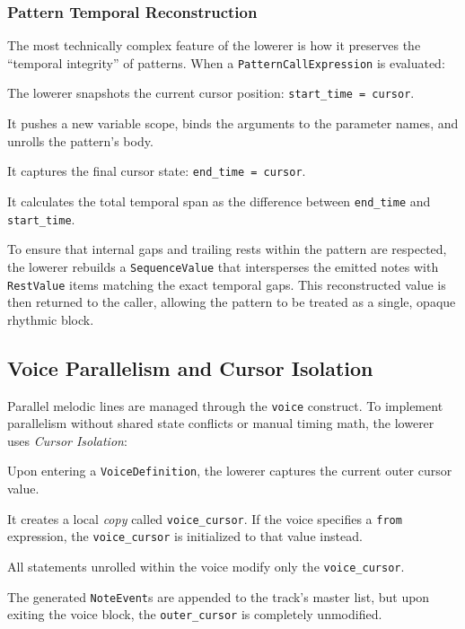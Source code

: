 \subsubsection{Pattern Temporal Reconstruction}
The most technically complex feature of the lowerer is how it preserves the ``temporal integrity'' of patterns.
When a \texttt{PatternCallExpression} is evaluated:

\noindent The lowerer snapshots the current cursor position: \texttt{start\_time = cursor}.

\noindent It pushes a new variable scope, binds the arguments to the parameter names, and unrolls the pattern's body.

\noindent It captures the final cursor state: \texttt{end\_time = cursor}.

\noindent It calculates the total temporal span as the difference between \texttt{end\_time} and \texttt{start\_time}.

To ensure that internal gaps and trailing rests within the pattern are respected, the lowerer rebuilds a
\texttt{SequenceValue} that intersperses the emitted notes with \texttt{RestValue} items matching the exact temporal
gaps.
This reconstructed value is then returned to the caller, allowing the pattern to be treated as a single, opaque rhythmic
block.

\subsection{Voice Parallelism and Cursor Isolation}\label{detail-subsec:voice-parallelism-and-cursor-isolation}

Parallel melodic lines are managed through the \texttt{voice} construct.
To implement parallelism without shared state conflicts or manual timing math, the lowerer uses
\textit{Cursor Isolation}:

\noindent Upon entering a \texttt{VoiceDefinition}, the lowerer captures the current outer cursor value.

\noindent It creates a local \textit{copy} called \texttt{voice\_cursor}.
If the voice specifies a \texttt{from} expression, the \texttt{voice\_cursor} is initialized to that value instead.

\noindent All statements unrolled within the voice modify only the \texttt{voice\_cursor}.

\noindent The generated \texttt{NoteEvent}s are appended to the track's master list, but upon exiting the
voice block, the
\texttt{outer\_cursor} is completely unmodified.

